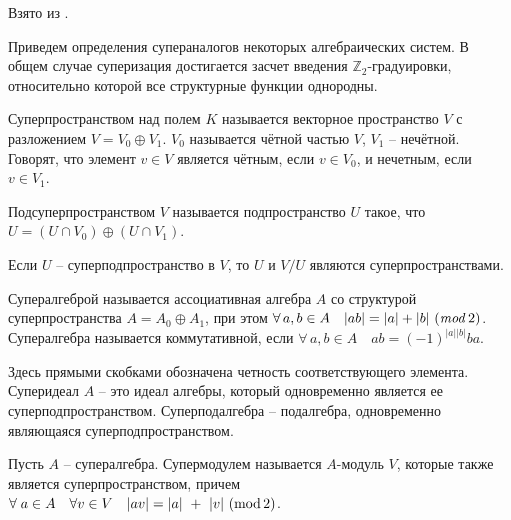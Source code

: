 Взято из \cite{donkin}.

Приведем определения супераналогов некоторых алгебраических систем. В общем случае суперизация достигается 
засчет введения $\mathbb{Z}_2$-градуировки, относительно которой все структурные функции однородны.

\begin{definition}
Суперпространством над полем $K$ называется векторное пространство $V$ с разложением $ V = V_0 \oplus V_1 $. $V_0$ называется чётной частью $V$, $V_1$ -- нечётной. 
Говорят, что элемент $v \in V$ является чётным, если $v \in V_0$, и нечетным, если $v \in V_1$.
\end{definition}
\begin{definition}
Подсуперпространством $V$ называется подпространство $U$ такое, что $ U = (U \cap V_0) \oplus (U \cap V_1) $.
\end{definition}
Если $U$ -- суперподпространство в $V$, то $U$ и $V/U$ являются суперпространствами.
\begin{definition}
Супералгеброй называется ассоциативная алгебра $A$ со структурой суперпространства $ A = A_0 \oplus A_1 $, 
при этом $ \forall\, a,b \in A \quad |ab| = |a| + |b| ~(\mbox{\textit{mod}}\,2) $.
Супералгебра называется коммутативной, если $ \forall\, a,b \in A \quad ab = (-1)^{|a| |b|} ba $.
\end{definition}
Здесь прямыми скобками обозначена четность соответствующего элемента.
Суперидеал $A$ -- это идеал алгебры, который одновременно является ее суперподпространством. 
Суперподалгебра -- подалгебра, одновременно являющаяся суперподпространством. 
\begin{definition}
Пусть $A$ -- супералгебра. Супермодулем называется $A$-модуль $V$, которые также является суперпространством, 
причем $ \forall \; a \in A \quad \forall v \in V \quad |av| = |a| ~+ ~|v| ~(\mbox{\textup{mod}}\,2) $.
\end{definition}

